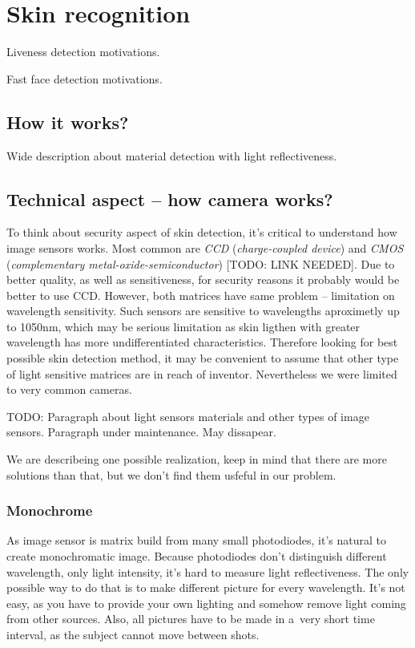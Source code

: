 \section{Skin recognition}
    Liveness detection motivations.

    Fast face detection motivations.

    \subsection{How it works?}
        Wide description about material detection
        with light reflectiveness.

    \subsection{Technical aspect -- how camera works?}
        To think about security aspect of skin detection,
        it's critical to understand how image sensors works.
        Most common are \textit{CCD} (\textit{charge-coupled device})
        and \textit{CMOS} (\textit{complementary metal-oxide-semiconductor})
        [TODO: LINK NEEDED]. %
        Due to better quality, as well as sensitiveness, for security reasons
        it probably would be better to use CCD.
        However, both matrices have same problem -- limitation on wavelength sensitivity.
        Such sensors are sensitive to wavelengths aproximetly up to 1050nm,
        which may be serious limitation as skin ligthen with greater wavelength has
        more undifferentiated characteristics.
        Therefore looking for best possible skin detection method,
        it may be convenient to assume that other type of light sensitive matrices
        are in reach of inventor.
        Nevertheless we were limited to very common cameras.

        TODO: Paragraph about light sensors materials and other types of image sensors.
        Paragraph under maintenance. May dissapear.

        We are describeing one possible realization, keep in mind that
        there are more solutions than that, but we don't find them usfeful in our problem.

        \subsubsection*{Monochrome}
            As image sensor is matrix build from many small photodiodes,
            it's natural to create monochromatic image.
            Because photodiodes don't distinguish different
            wavelength, only light intensity, it's hard
            to measure light reflectiveness.
            The only possible way to do that is to
            make different picture for every wavelength.
            It's not easy, as you have to
            provide your own lighting and somehow remove
            light coming from other sources.
            Also, all pictures have to be made in
            a~very short time interval, as the subject
            cannot move between shots.


